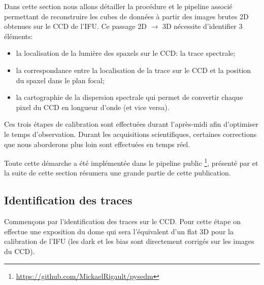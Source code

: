\documentclass[../main/main.tex]{subfiles}
\begin{document}
Dans cette section nous allons détailler la procédure et le pipeline
associé permettant de reconstruire les cubes de données à partir des
images brutes 2D obtenues sur le CCD de l'IFU. Ce passage 2D
$\rightarrow$ 3D nécessite d'identifier 3 éléments:

\begin{minipage}{\linewidth}
\begin{itemize}[label=$\diamondsuit$]
  \itemsep0em 
   \item la localisation de la lumière des spaxels sur le CCD: la trace spectrale;
   \item la correspondance entre la localisation de la trace sur le CCD et
     la position du spaxel dans le plan focal;
   \item la cartographie de la dispersion spectrale qui permet de
     convertir chaque pixel du CCD en longueur d'onde (et vice versa).
\end{itemize}
\end{minipage}
\vspace{0.1cm}

Ces trois étapes de calibration sont
effectuées durant l'après-midi afin d'optimiser le temps
d'observation. Durant les acquisitions scientifiques, certaines corrections que nous
aborderons plus loin sont effectuées en temps réel.

Toute cette démarche a été implémentée dans le pipeline public
\pysedm\footnote{\url{https://github.com/MickaelRigault/pysedm}}, présenté
par \citet{pysedm} et la suite de cette section résumera une grande partie de cette
publication.
\subsection{Identification des traces}\label{ssec:tracematch}
Commençons par l'identification des traces sur le CCD. Pour cette
étape on effectue une exposition du dome qui sera l'équivalent d'un flat 3D
pour la calibration de l'IFU (les dark et les bias sont directement
corrigés sur les images du CCD).
\vspace{0.1cm}
\end{document}
